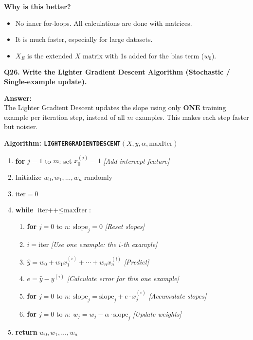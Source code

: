 \documentclass[12pt,a4paper]{article}
\newcommand{\question}[2]{%
    \begin{mdframed}[style=questionstyle]
        \textbf{\textcolor{headerblue}{Q#1.}} \textbf{#2}
    \end{mdframed}%
    \vspace{2pt}%
}
\newcommand{\ans}{\textbf{\textcolor{headerblue}{Answer:}}\\[4pt]}
\newcommand{\subhead}[1]{\textbf{\textcolor{headerblue}{#1}}}
\begin{document}
\subhead{Why is this better?}
\begin{itemize}[leftmargin=*]
    \item No inner for-loops. All calculations are done with matrices.
    \item It is much faster, especially for large datasets.
    \item $X_E$ is the extended $X$ matrix with 1s added for the bias term ($w_0$).
\end{itemize}

\vspace{10pt}
\question{26}{Write the Lighter Gradient Descent Algorithm (Stochastic / Single-example update).}

\ans

The Lighter Gradient Descent updates the slope using only \textbf{ONE} training example per iteration step, instead of all $m$ examples. This makes each step faster but noisier.

\subhead{Algorithm: \texttt{LIGHTERGRADIENTDESCENT}$(X, y, \alpha, \text{maxIter})$}

\begin{enumerate}[leftmargin=*]
    \item \textbf{for} $j = 1$ to $m$: set $x_0^{(j)} = 1$ \hfill \textit{[Add intercept feature]}
    \item Initialize $w_0, w_1, \ldots, w_n$ randomly
    \item $\text{iter} = 0$
    \item \textbf{while} $\text{iter++} \leq \text{maxIter}$:
    \begin{enumerate}
        \item \textbf{for} $j = 0$ to $n$: $\text{slope}_j = 0$ \hfill \textit{[Reset slopes]}
        \item $i = \text{iter}$ \hfill \textit{[Use one example: the $i$-th example]}
        \item $\hat{y} = w_0 + w_1 x_1^{(i)} + \cdots + w_n x_n^{(i)}$ \hfill \textit{[Predict]}
        \item $e = \hat{y} - y^{(i)}$ \hfill \textit{[Calculate error for this one example]}
        \item \textbf{for} $j = 0$ to $n$: $\text{slope}_j = \text{slope}_j + e \cdot x_j^{(i)}$ \hfill \textit{[Accumulate slopes]}
        \item \textbf{for} $j = 0$ to $n$: $w_j = w_j - \alpha \cdot \text{slope}_j$ \hfill \textit{[Update weights]}
    \end{enumerate}
    \item \textbf{return} $w_0, w_1, \ldots, w_n$
\end{enumerate}
\end{document}

